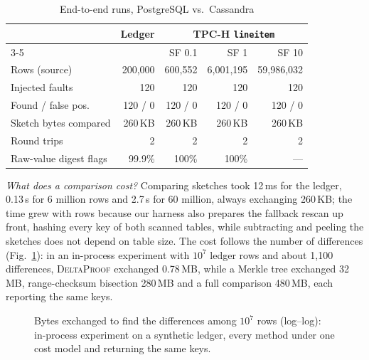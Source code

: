 \documentclass[conference]{IEEEtran}
\newcommand{\sys}{\textsc{DeltaProof}}
\begin{document}
\begin{table}[t]
\caption{End-to-end runs, PostgreSQL vs.\ Cassandra}
\label{tab:e2e}
\centering\footnotesize
\setlength{\tabcolsep}{3pt}
\begin{tabular}{@{}lrrrr@{}}
\toprule
& Ledger & \multicolumn{3}{c}{TPC-H \texttt{lineitem}}\\
\cmidrule(l){3-5}
& & SF 0.1 & SF 1 & SF 10\\
\midrule
Rows (source) & 200{,}000 & 600{,}552 & 6{,}001{,}195 & 59{,}986{,}032\\
Injected faults & 120 & 120 & 120 & 120\\
Found / false pos. & 120 / 0 & 120 / 0 & 120 / 0 & 120 / 0\\
Sketch bytes compared & 260\,KB & 260\,KB & 260\,KB & 260\,KB\\
Round trips & 2 & 2 & 2 & 2\\
Raw-value digest flags & 99.9\% & 100\% & 100\% & ---\\
\bottomrule
\end{tabular}
\end{table}

\emph{What does a comparison cost?} Comparing sketches took 12\,ms for the ledger, 0.13\,s for 6 million rows and 2.7\,s for 60 million, always exchanging 260\,KB; the time grew with rows because our harness also prepares the fallback rescan up front, hashing every key of both scanned tables, while subtracting and peeling the sketches does not depend on table size. The cost follows the number of differences (Fig.~\ref{fig:bytes}): in an in-process experiment with $10^7$ ledger rows and about 1{,}100 differences, \sys{} exchanged 0.78\,MB, while a Merkle tree exchanged 32\,MB, range-checksum bisection 280\,MB and a full comparison 480\,MB, each reporting the same keys.

\begin{figure}[t]
\centering
{}
\caption{Bytes exchanged to find the differences among $10^7$ rows (log--log): in-process experiment on a synthetic ledger, every method under one cost model and returning the same keys.}
\label{fig:bytes}
\end{figure}
\end{document}
